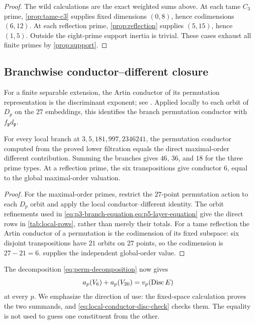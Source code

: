 \begin{proof}
The wild calculations are the exact weighted sums above.  At each tame
$C_3$ prime, \cref{prop:tame-c3} supplies fixed dimensions $(0,8)$, hence
codimensions $(6,12)$.  At each reflection prime,
\cref{prop:reflection} supplies $(5,15)$, hence $(1,5)$.  Outside the
eight-prime support inertia is trivial.  These cases exhaust all finite
primes by \cref{prop:support}.
\end{proof}

\subsection{Branchwise conductor--different closure}

For a finite separable extension, the Artin conductor of its permutation
representation is the discriminant exponent; see
\citet[Chapter VI, \S2, Corollary \(1'\), pp.~100--101, and \S3,
Proposition 6 and Corollary 1, pp.~103--104]{serre1979local}.  Applied
locally to each orbit of $D_p$ on the $27$ embeddings, this identifies the
branch permutation conductor with $f_{\mathfrak p}d_{\mathfrak p}$.

\begin{proposition}
\label{prop:branchwise-closure}
For every local branch at $3,5,181,997,2346241$, the permutation conductor
computed from the proved lower filtration equals the direct maximal-order
different contribution.  Summing the branches gives $46$, $36$, and $18$
for the three prime types.  At a reflection prime, the six transpositions
give conductor $6$, equal to the global maximal-order valuation.
\end{proposition}

\begin{proof}
For the maximal-order primes, restrict the $27$-point permutation action to
each $D_p$ orbit and apply the local conductor--different identity.  The
orbit refinements used in
\cref{eq:p3-branch-equation,eq:p5-layer-equation} give the direct rows in
\cref{tab:local-rows}, rather than merely their totals.  For a tame
reflection the Artin conductor of a permutation is the codimension of its
fixed subspace: six disjoint transpositions have $21$ orbits on $27$ points,
so the codimension is $27-21=6$.
 supplies the independent global-order value.
\end{proof}

The decomposition \cref{eq:perm-decomposition} now gives
\begin{equation}
 a_p(V_6)+a_p(V_{20})=v_p(\operatorname{Disc} E)
\label{eq:local-conductor-disc-check}
\end{equation}
at every $p$.  We emphasize the direction of use: the fixed-space
calculation proves the two summands, and
\cref{eq:local-conductor-disc-check} checks them.  The equality is not used
to guess one constituent from the other.

